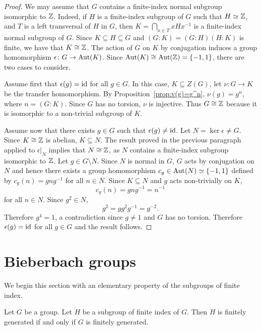 \begin{proof}
	We may assume that $G$ contains a finite-index normal subgroup isomorphic to $\mathbb{Z}$. Indeed, 
	if $H$ is a finite-index subgroup of $G$ such that $H\simeq\mathbb{Z}$, and $T$ is a left transversal of $H$ in $G$, then 
	$K=\bigcap_{x\in T}xHx^{-1}$ is a finite-index normal subgroup of $G$. Since $K\subseteq H\subseteq G$  and $(G:K)=(G:H)(H:K)$ is finite, we have that $K\cong\mathbb{Z}$.
	The action of $G$ on $K$ by conjugation induces a group homomorphism  
	$\epsilon\colon G\to\operatorname{Aut}(K)$. Since $\operatorname{Aut}(K)\cong\operatorname{Aut}(\mathbb{Z})=\{-1,1\}$, 
	there are two cases to consider.
	
	Assume first that $\epsilon(g)=\operatorname{id}$ for all $g\in G$. In this case, $K\subseteq Z(G)$, let
	$\nu\colon G\to K$ be the transfer homomorphism. By
	Proposition~\ref{prop:v(g)=g^n}, $\nu(g)=g^n$, where $n=(G:K)$. Since
	$G$ has no torsion, $\nu$ is injective. Thus
	$G\cong\mathbb{Z}$ because it is isomorphic to a non-trivial subgroup of $K$.

	Assume now that there exists $g\in G$ such that $\epsilon(g)\ne\operatorname{id}$. Let $N=\ker\epsilon\ne G$. Since
	$K\cong\mathbb{Z}$ is abelian, $K\subseteq N$. The result proved in the previous paragraph 
	applied to $\epsilon|_N$ implies that $N\cong\mathbb{Z}$, as 
	$N$ contains a finite-index subgroup isomorphic to $\mathbb{Z}$. Let $g\in G\setminus N$. 
	Since $N$ is normal in $G$, $G$ acts by conjugation on $N$ and hence 
	there exists a group homomorphism $c_g\in\operatorname{Aut}(N)\simeq\{-1,1\}$ defined by $c_g(n)=gng^{-1}$ for all $n\in N$. Since
	$K\subseteq N$ and $g$ acts non-trivially on $K$, 
	\[
	c_g(n)=gng^{-1}=n^{-1}
	\]
	for all $n\in N$.  Since 
	$g^2\in N$, 
	\[
		g^2=gg^2g^{-1}=g^{-2}.
	\]
	Therefore $g^4=1$, a contradiction since $g\ne1$ and $G$ has no torsion. Therefore $\epsilon(g)=\operatorname{id}$ for all $g\in G$ and the result follows.
\end{proof}

\section{Bieberbach groups}

We begin this section with an elementary property of the subgroups of finite index. 

\begin{lemma} \label{lem:fgfisubgroup}
Let $G$ be a group.  Let $H$ be a subgroup of finite index of $G$. Then $H$ is finitely generated if and only if $G$ is finitely generated.
\end{lemma}

